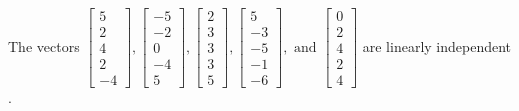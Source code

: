 \begin{exercise}
\begin{exerciseStatement}
  \end{exerciseStatement}
  \begin{exerciseAnswer}
   The vectors \(\left[\begin{array}{r}
5 \\
2 \\
4 \\
2 \\
-4
\end{array}\right] , \left[\begin{array}{r}
-5 \\
-2 \\
0 \\
-4 \\
5
\end{array}\right] , \left[\begin{array}{r}
2 \\
3 \\
3 \\
3 \\
5
\end{array}\right] , \left[\begin{array}{r}
5 \\
-3 \\
-5 \\
-1 \\
-6
\end{array}\right] , \text{ and } \left[\begin{array}{r}
0 \\
2 \\
4 \\
2 \\
4
\end{array}\right]\) are 
  	 linearly independent  .
  


  \end{exerciseAnswer}
\end{exercise}